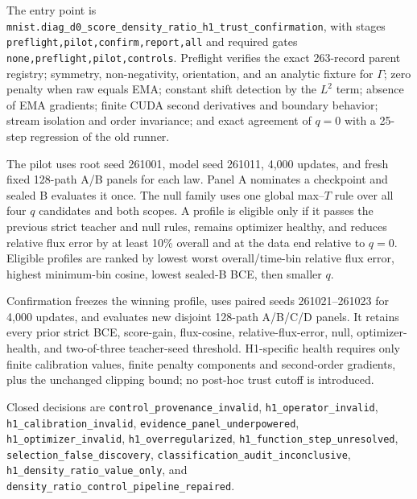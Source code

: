 \documentclass[11pt]{article}
\numberwithin{equation}{section}
\newcommand{\1}{\mathbf 1}
\begin{document}
The entry point is
\nolinkurl{mnist.diag_d0_score_density_ratio_h1_trust_confirmation}, with
stages \nolinkurl{preflight,pilot,confirm,report,all} and required gates
\nolinkurl{none,preflight,pilot,controls}.  Preflight verifies the exact
263-record parent registry; symmetry, non-negativity, orientation, and an
analytic fixture for \(\Gamma\); zero penalty when raw equals EMA; constant
shift detection by the \(L^2\) term; absence of EMA gradients; finite CUDA
second derivatives and boundary behavior; stream isolation and order
invariance; and exact agreement of \(q=0\) with a 25-step regression of the
old runner.

The pilot uses root seed 261001, model seed 261011, 4,000 updates, and fresh
fixed 128-path A/B panels for each law.  Panel A nominates a checkpoint and
sealed B evaluates it once.  The null family uses one global max--\(T\) rule
over all four \(q\) candidates and both scopes.  A profile is eligible only
if it passes the previous strict teacher and null rules, remains optimizer
healthy, and reduces relative flux error by at least 10\% overall and at the
data end relative to \(q=0\).  Eligible profiles are ranked by lowest worst
overall/time-bin relative flux error, highest minimum-bin cosine, lowest
sealed-B BCE, then smaller \(q\).

Confirmation freezes the winning profile, uses paired seeds
261021--261023 for 4,000 updates, and evaluates new disjoint 128-path A/B/C/D
panels.  It retains every prior strict BCE, score-gain, flux-cosine,
relative-flux-error, null, optimizer-health, and two-of-three teacher-seed
threshold.  H1-specific health requires only finite calibration values,
finite penalty components and second-order gradients, plus the unchanged
clipping bound; no post-hoc trust cutoff is introduced.

Closed decisions are
\nolinkurl{control_provenance_invalid},
\nolinkurl{h1_operator_invalid},
\nolinkurl{h1_calibration_invalid},
\nolinkurl{evidence_panel_underpowered},
\nolinkurl{h1_optimizer_invalid},
\nolinkurl{h1_overregularized},
\nolinkurl{h1_function_step_unresolved},
\nolinkurl{selection_false_discovery},
\nolinkurl{classification_audit_inconclusive},
\nolinkurl{h1_density_ratio_value_only}, and
\nolinkurl{density_ratio_control_pipeline_repaired}.
\end{document}

